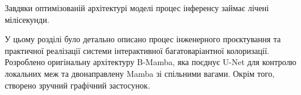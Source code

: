         Завдяки оптимізованій архітектурі моделі процес інференсу займає лічені мілісекунди.

\chapconclude{\ref{chap:implementation}}
    У цьому розділі було детально описано процес інженерного проєктування та практичної реалізації системи інтерактивної багатоваріантної колоризації.
    Розроблено оригінальну архітектуру B-Mamba, яка поєднує U-Net для контролю локальних меж та двонаправлену Mamba зі спільними вагами.
    Окрім того, створено зручний графічний застосунок.